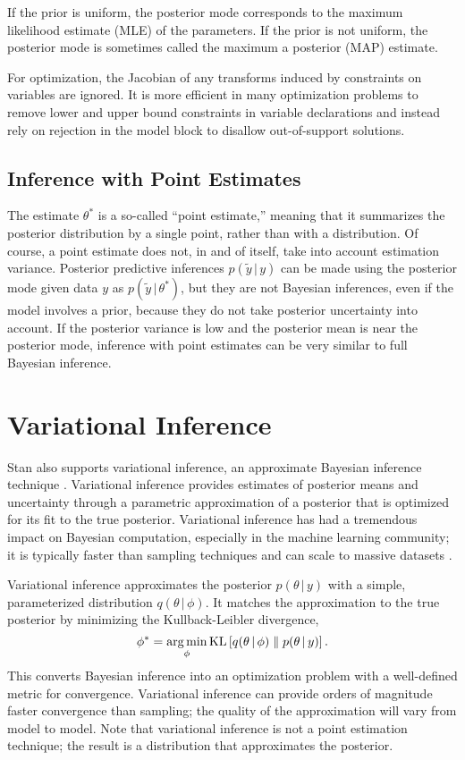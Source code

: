 If the prior is uniform, the posterior mode corresponds to the maximum
likelihood estimate (MLE) of the parameters.  If the prior is not
uniform, the posterior mode is sometimes called the maximum a
posterior (MAP) estimate. 

For optimization, the Jacobian of any transforms induced by
constraints on variables are ignored.  It is more efficient in many
optimization problems to remove lower and upper bound constraints in
variable declarations and instead rely on rejection in the model
block to disallow out-of-support solutions.


\subsection{Inference with Point Estimates}

The estimate $\theta^{*}$ is a so-called ``point estimate,'' meaning
that it summarizes the posterior distribution by a single point,
rather than with a distribution.  Of course, a point estimate does
not, in and of itself, take into account estimation variance.
Posterior predictive inferences $p(\tilde{y} \, | \, y)$ can be made using
the posterior mode given data $y$ as $p(\tilde{y} \, | \, \theta^*)$, but they
are not Bayesian inferences, even if the model involves a prior,
because they do not take posterior uncertainty into account.  If the
posterior variance is low and the posterior mean is near the posterior
mode, inference with point estimates can be very similar to full
Bayesian inference.


\section{Variational Inference}

Stan also supports variational inference, an approximate Bayesian
inference technique
\citep{Jordan:1999,Wainwright-Jordan:2008}. Variational inference
provides estimates of posterior means and uncertainty through a
parametric approximation of a posterior that is optimized for its fit
to the true posterior. Variational inference has had a tremendous
impact on Bayesian computation, especially in the machine learning
community; it is typically faster than sampling techniques and can
scale to massive datasets \citep{Hoffman:2013}.

Variational inference approximates the posterior
$p(\theta \, | \, y)$ with a simple, parameterized distribution
$q(\theta \, | \, \phi)$. It matches the approximation to the
true posterior by minimizing the Kullback-Leibler divergence,
%
\[
  \phi^* = \operatorname*{arg\,min}_\phi
  \textrm{KL}\left[ q(\theta \, | \, \phi) \;\|\; p(\theta \, | \, y) \right].
\]
%
This converts Bayesian inference into an optimization problem with a
well-defined metric for convergence. Variational inference can provide orders of
magnitude faster convergence than sampling; the quality of the approximation
will vary from model to model. Note that variational inference is not a point
estimation technique; the result is a distribution that approximates the
posterior.

